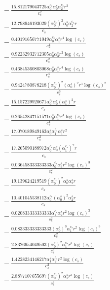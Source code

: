 \documentclass[10pt]{article}
\begin{document}
\begin{align*}
&{}  - \frac{15.812179043725 \alpha_{0}^{c_s} \alpha_{0}^s \alpha_{2}^{c_s} r^{2}}{c_{s}^{2}} \\
&{}  - \frac{12.798946193029 \left(\alpha_{0}^{c_s}\right)^{2} \alpha_{0}^s \alpha_{2}^{c_s} r}{c_{s}} \\
&{}  - \frac{0.40191656771049 \alpha_{0}^{c_s} \alpha_{1}^s r^{4} \log{\left(c_{s} \right)}}{c_{s}^{4}} \\
&{}  - \frac{0.92232932712305 \alpha_{0}^s \alpha_{3}^s r^{2} \log{\left(c_{s} \right)}}{c_{s}^{2}} \\
&{}  - \frac{0.46845360803068 \alpha_{0}^s \alpha_{1}^s r^{4} \log{\left(c_{s} \right)}}{c_{s}^{4}} \\
&{}  - \frac{0.9424780878218 \left(\alpha_{0}^{c_s}\right)^{2} \left(\alpha_{0}^s\right)^{2} r^{3} \log{\left(c_{s} \right)}^{2}}{c_{s}^{3}} \\
&{}  - \frac{15.157229920671 \alpha_{0}^{c_s} \alpha_{0}^s \left(\alpha_{1}^s\right)^{2} r}{c_{s}} \\
&{}  - \frac{0.26542847151571 \alpha_{0}^s \alpha_{1}^{c_s} r^{4} \log{\left(c_{s} \right)}}{c_{s}^{4}} \\
&{}  - \frac{17.070189849163 \alpha_{0}^s \alpha_{1}^{c_s} \alpha_{1}^s r^{2}}{c_{s}^{2}} \\
&{}  - \frac{17.265090188972 \alpha_{0}^{c_s} \alpha_{0}^s \left(\alpha_{1}^{c_s}\right)^{2} r}{c_{s}} \\
&{}  - \frac{0.036458333333333 \alpha_{0}^{c_s} \alpha_{3}^s r^{2} \log{\left(c_{s} \right)}^{3}}{c_{s}^{2}} \\
&{}  - \frac{19.139624219519 \left(\alpha_{0}^{c_s}\right)^{2} \alpha_{0}^s \alpha_{2}^s r}{c_{s}} \\
&{}  - \frac{10.401045538112 \alpha_{0}^{c_s} \left(\alpha_{0}^s\right)^{2} \alpha_{2}^s r}{c_{s}} \\
&{}  - \frac{0.020833333333333 \alpha_{1}^{c_s} \alpha_{2}^s r^{2} \log{\left(c_{s} \right)}^{3}}{c_{s}^{2}} \\
&{}  - \frac{0.083333333333333 \left(\alpha_{0}^s\right)^{3} \alpha_{1}^{c_s} r^{2} \log{\left(c_{s} \right)}^{3}}{c_{s}^{2}} \\
&{}  - \frac{2.8326954049503 \left(\alpha_{0}^s\right)^{2} \alpha_{1}^{c_s} r^{3} \log{\left(c_{s} \right)}}{c_{s}^{3}} \\
&{}  - \frac{1.4228234146217 \alpha_{1}^s \alpha_{2}^{c_s} r^{2} \log{\left(c_{s} \right)}}{c_{s}^{2}} \\
&{}  - \frac{2.8877107655697 \left(\alpha_{0}^{c_s}\right)^{2} \alpha_{1}^s r^{3} \log{\left(c_{s} \right)}}{c_{s}^{3}} \\

\end{align*}
\end{document}
